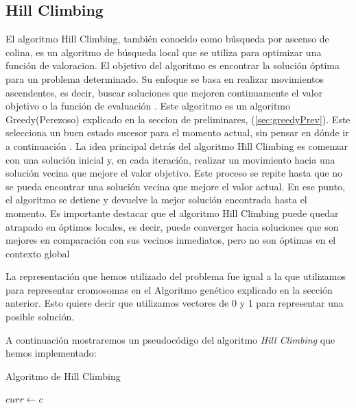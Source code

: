 \subsection{Hill Climbing}
\label{alg:approachHC}
El algoritmo Hill Climbing, también conocido como búsqueda por ascenso de
colina\cite{Russell:2009}, es un algoritmo de búsqueda local que se utiliza para
optimizar una función de valoracion. El objetivo del algoritmo es encontrar la
solución óptima  para un problema determinado.  Su enfoque se
basa en realizar movimientos ascendentes, es decir, buscar soluciones que
mejoren continuamente el valor objetivo o la función de evaluación .
Este algoritmo es un algoritmo Greedy(Perezoso) explicado en la seccion de
preliminares, (\ref{sec:greedyPrev}). Este selecciona un buen estado sucesor
para el momento actual, sin pensar en dónde ir a continuación . 
La idea principal detrás del algoritmo Hill Climbing es comenzar con una solución inicial y, en cada iteración, realizar un movimiento hacia una solución vecina que mejore el valor objetivo. Este proceso se repite hasta que no se pueda encontrar una solución vecina que mejore el valor actual. En ese punto, el algoritmo se detiene y devuelve la mejor solución encontrada hasta el momento.
Es importante destacar que el algoritmo Hill Climbing puede quedar atrapado en óptimos locales, es decir, puede converger hacia soluciones que son mejores en comparación con sus vecinos inmediatos, pero no son óptimas en el contexto global

La representación que hemos utilizado del problema fue igual a la que utilizamos para representar cromosomas en el Algoritmo genético explicado en la sección anterior. Esto quiere decir que utilizamos vectores de 0 y 1 para representar una posible solución. 

A continuación mostraremos un pseudocódigo del algoritmo \emph{Hill Climbing} que hemos implementado:

\begin{algorithm}[H]
  \caption{Algoritmo de Hill Climbing}
  \label{algo:hill_climbing}
  \SetAlgoLined
  $curr \gets c$\; 
  
  \;
\end{algorithm}

